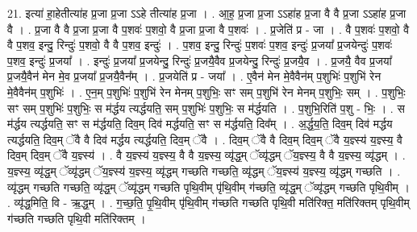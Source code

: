 \documentclass[17pt]{extarticle}
\begin{document}
21. इत्या॑ हा॒हेतीत्या॑ह प्र॒जा प्र॒जा ऽऽहे तीत्या॑ह प्र॒जा । . आ॒ह॒ प्र॒जा प्र॒जा ऽऽहा॑ह प्र॒जा वै वै प्र॒जा ऽऽहा॑ह प्र॒जा वै । . प्र॒जा वै वै प्र॒जा प्र॒जा वै प॒शवः॑ प॒शवो॒ वै प्र॒जा प्र॒जा वै प॒शवः॑ । . प्र॒जेति॑ प्र - जा । . वै प॒शवः॑ प॒शवो॒ वै वै प॒शव॒ इन्दु॒ रिन्दुः॑ प॒शवो॒ वै वै प॒शव॒ इन्दुः॑ । . प॒शव॒ इन्दु॒ रिन्दुः॑ प॒शवः॑ प॒शव॒ इन्दुः॑ प्र॒जया᳚ प्र॒जयेन्दुः॑ प॒शवः॑ प॒शव॒ इन्दुः॑ प्र॒जया᳚ । . इन्दुः॑ प्र॒जया᳚ प्र॒जयेन्दु॒ रिन्दुः॑ प्र॒जयै॒वैव प्र॒जयेन्दु॒ रिन्दुः॑ प्र॒जयै॒व । . प्र॒जयै॒ वैव प्र॒जया᳚ प्र॒जयै॒वैन॑ मेन मे॒व प्र॒जया᳚ प्र॒जयै॒वैन᳚म् । . प्र॒जयेति॑ प्र - जया᳚ । . ए॒वैन॑ मेन मे॒वैवैन॑म् प॒शुभिः॑ प॒शुभि॑ रेन मे॒वैवैन॑म् प॒शुभिः॑ । . ए॒न॒म् प॒शुभिः॑ प॒शुभि॑ रेन मेनम् प॒शुभिः॒ सꣳ सम् प॒शुभि॑ रेन मेनम् प॒शुभिः॒ सम् । . प॒शुभिः॒ सꣳ सम् प॒शुभिः॑ प॒शुभिः॒ स म॑र्द्धय त्यर्द्धयति॒ सम् प॒शुभिः॑ प॒शुभिः॒ स म॑र्द्धयति । . प॒शुभि॒रिति॑ प॒शु - भिः॒ । . स म॑र्द्धय त्यर्द्धयति॒ सꣳ स म॑र्द्धयति॒ दिव॒म् दिव॑ मर्द्धयति॒ सꣳ स म॑र्द्धयति॒ दिव᳚म् । . अ॒र्द्ध॒य॒ति॒ दिव॒म् दिव॑ मर्द्धय त्यर्द्धयति॒ दिव॒म् ॅवै वै दिव॑ मर्द्धय त्यर्द्धयति॒ दिव॒म् ॅवै । . दिव॒म् ॅवै वै दिव॒म् दिव॒म् ॅवै य॒ज्ञ्स्य॑ य॒ज्ञ्स्य॒ वै दिव॒म् दिव॒म् ॅवै य॒ज्ञ्स्य॑ । . वै य॒ज्ञ्स्य॑ य॒ज्ञ्स्य॒ वै वै य॒ज्ञ्स्य॒ व्यृ॑द्ध॒म् ॅव्यृ॑द्धम् ॅय॒ज्ञ्स्य॒ वै वै य॒ज्ञ्स्य॒ व्यृ॑द्धम् । . य॒ज्ञ्स्य॒ व्यृ॑द्ध॒म् ॅव्यृ॑द्धम् ॅय॒ज्ञ्स्य॑ य॒ज्ञ्स्य॒ व्यृ॑द्धम् गच्छति गच्छति॒ व्यृ॑द्धम् ॅय॒ज्ञ्स्य॑ य॒ज्ञ्स्य॒ व्यृ॑द्धम् गच्छति । . व्यृ॑द्धम् गच्छति गच्छति॒ व्यृ॑द्ध॒म् ॅव्यृ॑द्धम् गच्छति पृथि॒वीम् पृ॑थि॒वीम् ग॑च्छति॒ व्यृ॑द्ध॒म् ॅव्यृ॑द्धम् गच्छति पृथि॒वीम् । . व्यृ॑द्ध॒मिति॒ वि - ऋ॒द्ध॒म् । . ग॒च्छ॒ति॒ पृ॒थि॒वीम् पृ॑थि॒वीम् ग॑च्छति गच्छति पृथि॒वी मति॑रिक्त॒ मति॑रिक्तम् पृथि॒वीम् ग॑च्छति गच्छति पृथि॒वी मति॑रिक्तम् । \newline
\end{document}
